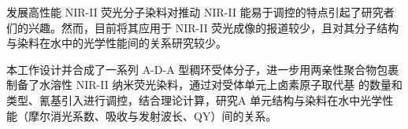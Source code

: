 
发展高性能 NIR-II 荧光分子染料对推动 NIR-II 能易于调控的特点引起了研究者们的兴趣。然而，目前将其应用于 NIR-II 荧光成像的报道较少，且对其分子结构与染料在水中的光学性能间的关系研究较少。

本工作设计并合成了一系列 A-D-A 型稠环受体分子，进一步用两亲性聚合物包裹制备了水溶性 NIR-II 纳米荧光染料，通过对受体单元上卤素原子取代基 的数量和类型、氰基引入进行调控，结合理论计算，研究A 单元结构与染料在水中光学性能（摩尔消光系数、吸收与发射波长、QY）间的关系。